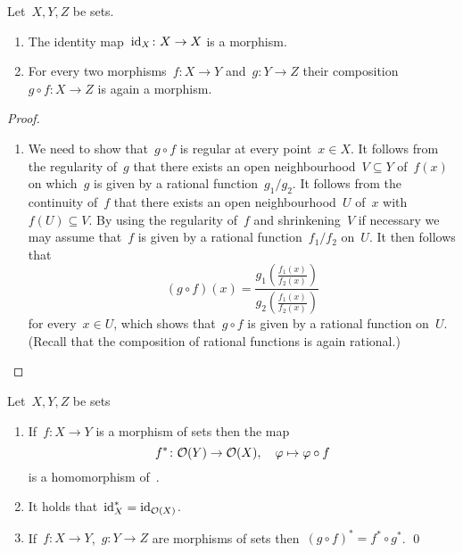 \begin{lemma}
  Let~$X, Y, Z$ be {\qaffine} sets.
  \begin{enumerate}
    \item
      The identity map~$\operatorname{id}_X \colon X \to X$ is a morphism.
    \item
      For every two morphisms~$f \colon X \to Y$ and~$g \colon Y \to Z$ their composition~$g \circ f \colon X \to Z$ is again a morphism.
  \end{enumerate}
\end{lemma}


\begin{proof}
  \leavevmode
  \begin{enumerate}[start=2]
    \item
      We need to show that~$g \circ f$ is regular at every point~$x \in X$.
      It follows from the regularity of~$g$ that there exists an open neighbourhood~$V \subseteq Y$ of~$f(x)$ on which~$g$ is given by a rational function~$g_1/g_2$.
      It follows from the continuity of~$f$ that there exists an open neighbourhood~$U$ of~$x$ with~$f(U) \subseteq V$.
      By using the regularity of~$f$ and shrinkening~$V$ if necessary we may assume that~$f$ is given by a rational function~$f_1/f_2$ on~$U$.
      It then follows that
      \[
          (g \circ f)(x)
        = \frac{ g_1\left( \frac{f_1(x)}{f_2(x)} \right) }{ g_2\left( \frac{f_1(x)}{f_2(x)} \right) }
      \]
      for every~$x \in U$, which shows that~$g \circ f$ is given by a rational function on~$U$.
      (Recall that the composition of rational functions is again rational.)
    \qedhere
  \end{enumerate}
\end{proof}



\begin{lemma}
  Let~$X, Y, Z$ be {\qaffine} sets
  \begin{enumerate}
    \item
      If~$f \colon X \to Y$ is a morphism of {\qaffine} sets then the map
      \[
                  f^*
        \colon    \mathcal{O}(Y)
        \to       \mathcal{O}(X),
        \quad     \varphi
        \mapsto   \varphi \circ f
      \]
      is a homomorphism of~.
    \item
      It holds that~$\operatorname{id}_X^* = \operatorname{id}_{\mathcal{O}(X)}$.
    \item
      If~$f \colon X \to Y$,~$g \colon Y \to Z$ are morphisms of {\qaffine} sets then~$(g \circ f)^* = f^* \circ g^*$.
    \qed
  \end{enumerate}
\end{lemma}




